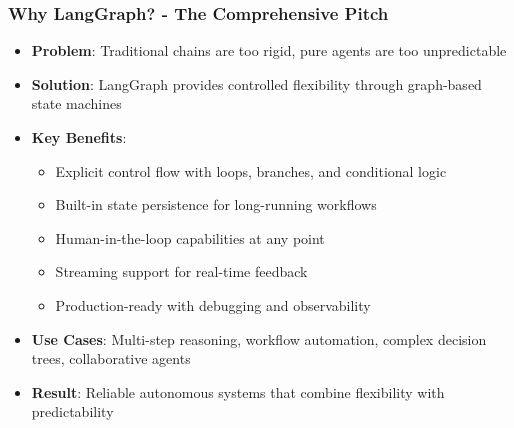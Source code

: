 \begin{frame}[fragile]\frametitle{Why LangGraph? - The Comprehensive Pitch}
      \begin{itemize}
        \item \textbf{Problem}: Traditional chains are too rigid, pure agents are too unpredictable
        \item \textbf{Solution}: LangGraph provides controlled flexibility through graph-based state machines
        \item \textbf{Key Benefits}:
        \begin{itemize}
            \item Explicit control flow with loops, branches, and conditional logic
            \item Built-in state persistence for long-running workflows
            \item Human-in-the-loop capabilities at any point
            \item Streaming support for real-time feedback
            \item Production-ready with debugging and observability
        \end{itemize}
        \item \textbf{Use Cases}: Multi-step reasoning, workflow automation, complex decision trees, collaborative agents
        \item \textbf{Result}: Reliable autonomous systems that combine flexibility with predictability
      \end{itemize}
\end{frame}

